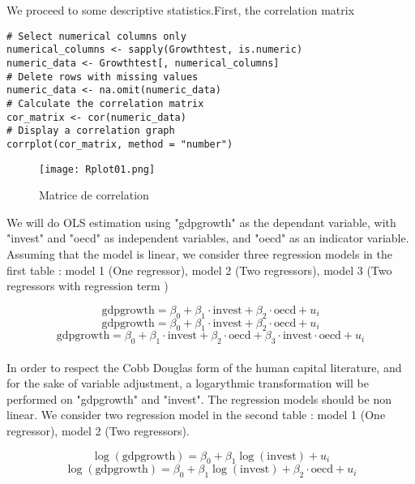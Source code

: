 \documentclass[12pt,fleqn]{report}
\begin{document}
 We proceed to some descriptive statistics.First, the correlation matrix

\begin{lstlisting}
# Select numerical columns only
numerical_columns <- sapply(Growthtest, is.numeric)
numeric_data <- Growthtest[, numerical_columns]
# Delete rows with missing values
numeric_data <- na.omit(numeric_data)
# Calculate the correlation matrix
cor_matrix <- cor(numeric_data)
# Display a correlation graph
corrplot(cor_matrix, method = "number")
\end{lstlisting}

\begin{figure}[h]
  \centering
  \texttt{[image: Rplot01.png]}
  \caption{Matrice de correlation}
  \label{fig:Rrplot01}
\end{figure}

We will do OLS estimation using "gdpgrowth" as the dependant variable, with "invest" and "oecd" as independent variables, and "oecd" as an indicator variable. Assuming that the model is linear, we consider three regression models in the first table : model 1 (One regressor), model 2 (Two regressors), model 3 (Two regressors with regression term )

\begin{equation}
\text{gdpgrowth} = \beta_0 + \beta_1 \cdot\text{invest} + \beta_2 \cdot \text{oecd} + u_i
\end{equation}
\begin{equation}
\text{gdpgrowth} = \beta_0 + \beta_1 \cdot\text{invest} + \beta_2 \cdot \text{oecd} + u_i
\end{equation}
\begin{equation}
\text{gdpgrowth} = \beta_0 + \beta_1 \cdot\text{invest} + \beta_2 \cdot \text{oecd} +  \beta_3 \cdot \text{invest} \cdot \text{oecd} + u_i
\end{equation}
\\
In order to respect the Cobb Douglas form of the human capital literature, and for the sake of variable adjustment, a logarythmic transformation will be performed on "gdpgrowth" and "invest". The regression models should be non linear. We consider two regression model in the second table : model 1 (One regressor), model 2 (Two regressors).

\begin{equation}
\log(\text{gdpgrowth}) = \beta_0 + \beta_1 \log(\text{invest}) + u_i
\end{equation}
\begin{equation}
\log(\text{gdpgrowth}) = \beta_0 + \beta_1 \log(\text{invest}) + \beta_2 \cdot \text{oecd} + u_i
\end{equation}
\end{document}
